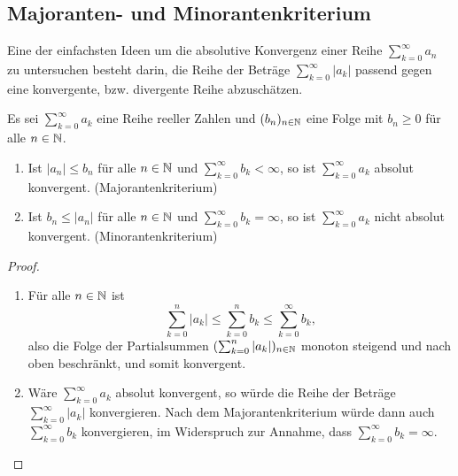 \documentclass[a4paper,10pt]{article}
\begin{document}
\subsection{Majoranten- und Minorantenkriterium}

Eine der einfachsten Ideen um die absolutive Konvergenz einer Reihe $\sum_{k=0}^\infty a_n$ zu untersuchen besteht darin, die Reihe der Beträge $\sum_{k=0}^\infty |a_k|$ passend gegen eine konvergente, bzw. divergente Reihe abzuschätzen.


\begin{lem}
 Es sei $\sum_{k=0}^\infty a_k$ eine Reihe reeller Zahlen und $(b_n)_{n \in \mathbb{N}}$ eine Folge mit $b_n \geq 0$ für alle $n \in \mathbb{N}$.
 \begin{enumerate}
  \item
   Ist $|a_n| \leq b_n$ für alle $n \in \mathbb{N}$ und $\sum_{k=0}^\infty b_k < \infty$, so ist $\sum_{k=0}^\infty a_k$ absolut konvergent. (Majorantenkriterium)
  \item
   Ist $b_n \leq |a_n|$ für alle $n \in \mathbb{N}$ und $\sum_{k=0}^\infty b_k = \infty$, so ist $\sum_{k=0}^\infty a_k$ nicht absolut konvergent. (Minorantenkriterium)
 \end{enumerate}
\end{lem}
\begin{proof}
 \begin{enumerate}
  \item
   Für alle $n \in \mathbb{N}$ ist
   \[
    \sum_{k=0}^n |a_k| \leq \sum_{k=0}^n b_k \leq \sum_{k=0}^\infty b_k,
   \]
   also die Folge der Partialsummen $(\sum_{k=0}^n |a_k|)_{n \in \mathbb{N}}$ monoton steigend und nach oben beschränkt, und somit konvergent.
  \item
   Wäre $\sum_{k=0}^\infty a_k$ absolut konvergent, so würde die Reihe der Beträge $\sum_{k=0}^\infty |a_k|$ konvergieren. Nach dem Majorantenkriterium würde dann auch $\sum_{k=0}^\infty b_k$ konvergieren, im Widerspruch zur Annahme, dass $\sum_{k=0}^\infty b_k = \infty$.
  \qedhere
 \end{enumerate}
\end{proof}
\end{document}
